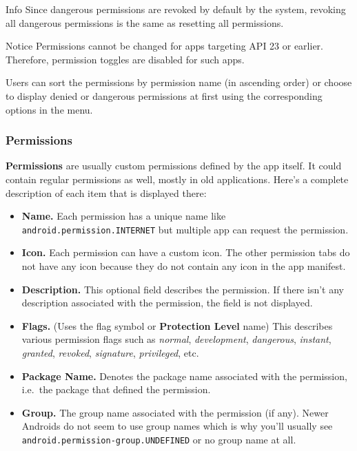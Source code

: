 \begin{tip}{Info}
    Since dangerous permissions are revoked by default by the system, revoking all dangerous permissions is the same as
    resetting all permissions.
\end{tip}

\begin{tip}{Notice}
    Permissions cannot be changed for apps targeting API 23 or earlier. Therefore, permission toggles are disabled for
    such apps.
\end{tip}

Users can sort the permissions by permission name (in ascending order) or choose to display denied or dangerous
permissions at first using the corresponding options in the menu.

\subsubsection{Permissions}\label{subsubsec:permissions} %
\textbf{Permissions} are usually custom permissions defined by the app itself. It could contain regular permissions as
well, mostly in old applications. Here's a complete description of each item that is displayed there:
\begin{itemize}
    \item \textbf{Name.} Each permission has a unique name like \texttt{android.permission.INTERNET} but multiple app
    can request the permission.

    \item \textbf{Icon.} Each permission can have a custom icon. The other permission tabs do not have any icon because
    they do not contain any icon in the app manifest.

    \item \textbf{Description.} This optional field describes the permission. If there isn't any description associated
    with the permission, the field is not displayed.

    \item \textbf{Flags.} (Uses the flag symbol or \textbf{Protection Level} name) This describes various permission flags such
    as \textit{normal}, \textit{development}, \textit{dangerous}, \textit{instant}, \textit{granted}, \textit{revoked},
    \textit{signature}, \textit{privileged}, etc.

    \item \textbf{Package Name.} Denotes the package name associated with the permission, i.e.\ the package that defined
    the permission.

    \item \textbf{Group.} The group name associated with the permission (if any). Newer Androids do not seem to use
    group names which is why you'll usually see \texttt{android.permission-group.UNDEFINED} or no group name at all.
\end{itemize}

